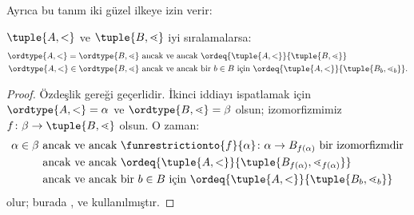Ayrıca bu tanım iki güzel ilkeye izin verir:

\begin{cor}
$\tuple{A,<}$ ve $\tuple{B,\lessdot}$ iyi sıralamalarsa:
\begin{align*}
	\ordtype{A, <} = \ordtype{B, \lessdot}&\text{ ancak ve ancak }\ordeq{\tuple{A, <}}{\tuple{B, \lessdot}}\\
	\ordtype{A, <} \in \ordtype{B, \lessdot}&\text{ ancak ve ancak bir }b \in B\text{ için }\ordeq{\tuple{A, <}}{\tuple{B_b, \lessdot_b}}.
\end{align*}
\end{cor}

\begin{proof}
Özdeşlik  gereği geçerlidir. İkinci iddiayı
ispatlamak için $\ordtype{A,<}=\alpha$ ve
$\ordtype{B,\lessdot}=\beta$ olsun; izomorfizmimiz
$f\colon\beta\to\tuple {B,\lessdot}$ olsun. O zaman:
\begin{align*}
	\alpha \in \beta&\text{ ancak ve ancak }\funrestrictionto{f}{\alpha} \colon \alpha \to B_{f(\alpha)}\text{ bir izomorfizmdir}\\
	&\text{ ancak ve ancak }\ordeq{\tuple{A, <}}{\tuple{B_{f(\alpha)}, \lessdot_{f(\alpha)}}}\\
	&\text{ ancak ve ancak bir $b \in B$ için }\ordeq{\tuple{A, <}}{\tuple{B_b, \lessdot_b}}
\end{align*}
olur; burada ,
 ve
 kullanılmıştır.
\end{proof}

